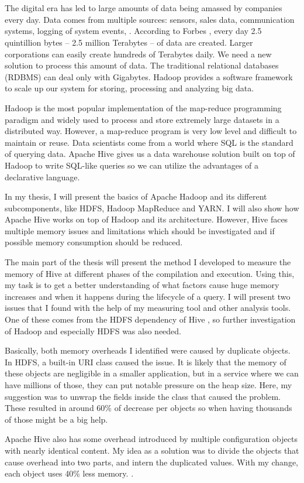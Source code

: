 \chapter{\bevezetes}

The digital era has led to large amounts of data being amassed by companies every day. Data comes from multiple sources: sensors, sales data, communication systems, logging of system events, \etc. According to Forbes \cite{Forbes}, every day 2.5 quintillion bytes – 2.5 million Terabytes – of data are created. Larger corporations can easily create hundreds of Terabytes daily. We need a new solution to process this amount of data. The traditional relational databases (RDBMS) can deal only with Gigabytes. Hadoop provides a software framework to scale up our system for storing, processing and analyzing big data.

Hadoop is the most popular implementation of the map-reduce programming paradigm and widely used to process and store extremely large datasets in a distributed way. However, a map-reduce program is very low level and difficult to maintain or reuse. Data scientists come from a world where SQL is the standard of querying data. Apache Hive gives us a data warehouse solution built on top of Hadoop to write SQL-like queries so we can utilize the advantages of a declarative language.

In my thesis, I will present the basics of Apache Hadoop and its different subcomponents, like HDFS, Hadoop MapReduce and YARN. I will also show how Apache Hive works on top of Hadoop and its architecture. However, Hive faces multiple memory issues and limitations which should be investigated and if possible memory consumption should be reduced.

The main part of the thesis will present the method  I developed to measure the memory of Hive at different phases of the compilation and execution. Using this, my task is to get a better understanding of what factors cause huge memory increases and when it happens during the lifecycle of a query. I will present two issues that I found with the help of my measuring tool and other analysis tools. One of these comes from the HDFS dependency of Hive \cite{hdfs-path}, so further investigation of Hadoop and especially HDFS was also needed. 


Basically, both memory overheads I identified were caused by duplicate objects. In HDFS, a built-in URI class caused the issue. It is likely that the memory of these objects are negligible in a smaller application, but in a service where we can have millions of those, they can put notable pressure on the heap size. Here, my suggestion was to unwrap the fields inside the class that caused the problem. These resulted in around 60\% of decrease per objects so when having thousands of those might be a big help.

Apache Hive also has some overhead introduced by multiple configuration objects with nearly identical content. My idea as a solution was to divide the objects that cause overhead into two parts, and intern the duplicated values. With my change, each object uses 40\% less memory. \cite{hive-conf}.